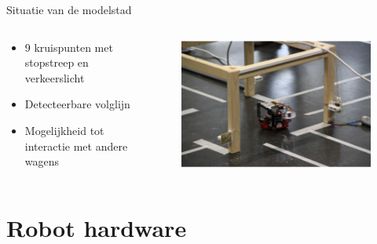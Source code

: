\documentclass[aspectratio=169,kulak,t,handout]{kulakbeamer} %
\begin{document}
\begin{frame}{Situatie van de modelstad}
	\begin{columns}
		\begin{column}{0.47\textwidth}\centering


			\begin{itemize}
				\normalsize\item 9 kruispunten met stopstreep en verkeerslicht
				\item Detecteerbare volglijn
				\item Mogelijkheid tot interactie met andere wagens
			\end{itemize}

		\end{column}
		\begin{column}{0.75\textwidth}\centering
			\begin{figure}
				\centering
				\includegraphics[width=.60\textwidth]{modelstad}
				
				\label{fig:CAD-model}
			\end{figure}
		\end{column}
	\end{columns}
\end{frame}






\section{Robot hardware}
\end{document}
